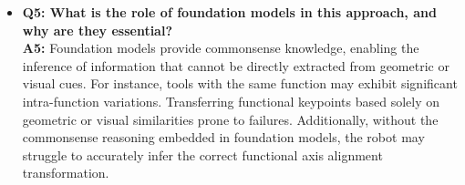 \begin{itemize}
    \item \textbf{Q5: What is the role of foundation models in this approach, and why are they essential?} \\
    \textbf{A5:} Foundation models provide commonsense knowledge, enabling the inference of information that cannot be directly extracted from geometric or visual cues. For instance, tools with the same function may exhibit significant intra-function variations. Transferring functional keypoints based solely on geometric or visual similarities prone to failures. Additionally, without the commonsense reasoning embedded in foundation models, the robot may struggle to accurately infer the correct functional axis alignment transformation. \\
\end{itemize}





